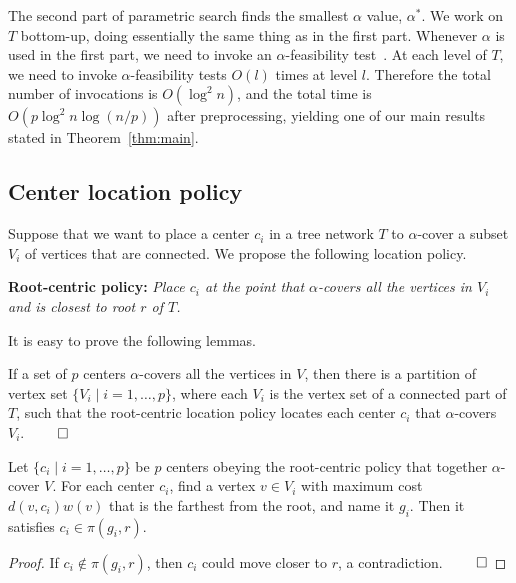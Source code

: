 \documentclass{llncs}
\newcommand{\hide}[1]{}
\newcommand{\QED}{\hfill$\qed$}
\begin{document}
{The second part of parametric search
finds the smallest $\alpha$ value, $\alpha^*$.
We work on $T$ bottom-up, doing essentially the same thing as in the first part.
Whenever $\alpha$ is used in the first part,
we need to invoke an $\alpha$-feasibility test~\cite{megiddo1979}.
At each level of $T$,
we need to invoke $\alpha$-feasibility tests $O(l)$ times at level $l$.
Therefore the total number of invocations is $O(\log^2 n)$,
and the total time is $O(p\log^2n\log(n/p))$ after preprocessing,
yielding one of our main results stated in Theorem~\ref{thm:main}.

\subsection{Center location policy}
Suppose that we want to place a center $c_i$ in a tree network $T$ to $\alpha$-cover
a subset $V_i$ of vertices that are connected.
We propose the following location policy.

\medskip\noindent
{\bf Root-centric policy:}
{\em Place $c_i$ at the point that $\alpha$-covers all the vertices in $V_i$ and is closest to root $r$ of $T$.}


It is easy to prove the following lemmas.
\begin{lemma}\label{lem:location}
If a set of $p$ centers $\alpha$-covers all the vertices in $V$,
then there is a partition of vertex set $\{V_i\mid i = 1, \ldots, p\}$,
where each $V_i$ is the vertex set of a connected part of $T$,
such that the root-centric location policy locates each center $c_i$ that $\alpha$-covers $V_i$.
\QED
\end{lemma}
\hide{\begin{proof}
Consider a set $C=\{c_i\mid i = 1, \ldots, p\}$ of centers that together $\alpha$-covers $V$,
but some centers violate the root-centric location policy.
For each $c_i \in C$, 
let $V_i$ be the set of vertices that are closer to $c_i$ than to any other center.
If there is a tie, then the tie should be broken arbitrarily.
It is clear that $V_i$ is $\alpha$-covered by $c_i$.
We now move $c_i$ towards the root $r$ as far as possible without affecting its coverage
of $V_i$.
The resulting centers $\{c'_i\mid i = 1, \ldots, p\}$ satisfy the root-centric location policy.
\end{proof}
}

\begin{lemma}\label{lem:Rcentric}
Let  $\{c_i\mid i = 1, \ldots, p\}$ be $p$ centers obeying the root-centric policy
that together $\alpha$-cover $V$.
For each center $c_i$, find a vertex $v\in V_i$ with maximum cost $d(v,c_i) w(v)$
that is the farthest from the root,
and name it $g_i$.
Then it satisfies $c_i \in \pi(g_i,r)$.
\end{lemma}
\begin{proof}
If $c_i \notin \pi(g_i,r)$, then $c_i$ could move closer to $r$,
a contradiction.
\QED
\end{proof}


}
\end{document}
